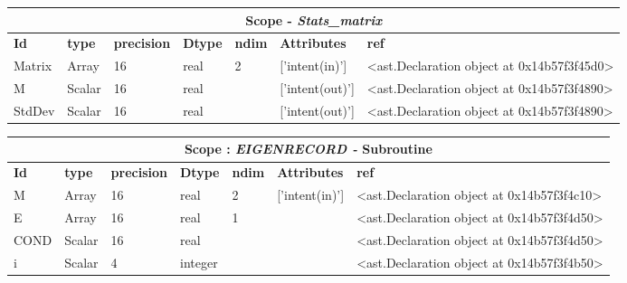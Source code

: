 \documentclass{report}
\begin{document}
 \vspace{1cm}

\begin{center}
\begin{longtable}{|p{3.5cm}|p{1.5cm}|p{1.5cm}|p{1.5cm}|p{1cm}|p{2cm}|p{4cm}| }
\hline
\multicolumn{7}{|c|}{\textbf{Scope} -  \textbf{\textit{Stats\_matrix}}} \\ 
\hline
\textbf{Id} & \textbf{type} & \textbf{precision} & \textbf{Dtype} & \textbf{ndim} & \textbf{Attributes} & \textbf{ref} \\\hline

Matrix & Array & 16 & real & 2 & ['intent(in)'] & <ast.Declaration object at 0x14b57f3f45d0> \\\hline

M & Scalar & 16 & real &  & ['intent(out)'] & <ast.Declaration object at 0x14b57f3f4890> \\\hline

StdDev & Scalar & 16 & real &  & ['intent(out)'] & <ast.Declaration object at 0x14b57f3f4890> \\\hline

\end{longtable}
\end{center}

 \vspace{1cm}

\begin{center}
\begin{longtable}{|p{3.5cm}|p{1.5cm}|p{1.5cm}|p{1.5cm}|p{1cm}|p{2cm}|p{4cm}| }
\hline
\multicolumn{7}{|c|}{\textbf{Scope : \qquad}  \textbf{\textit{EIGENRECORD - }Subroutine}}\\ 
\hline
\textbf{Id} & \textbf{type} & \textbf{precision} & \textbf{Dtype} & \textbf{ndim} & \textbf{Attributes} & \textbf{ref} \\\hline

M & Array & 16 & real & 2 & ['intent(in)'] & <ast.Declaration object at 0x14b57f3f4c10> \\\hline

E & Array & 16 & real & 1 &  & <ast.Declaration object at 0x14b57f3f4d50> \\\hline

COND & Scalar & 16 & real &  &  & <ast.Declaration object at 0x14b57f3f4d50> \\\hline

i & Scalar & 4 & integer &  &  & <ast.Declaration object at 0x14b57f3f4b50> \\\hline

\end{longtable}
\end{center}
\end{document}
